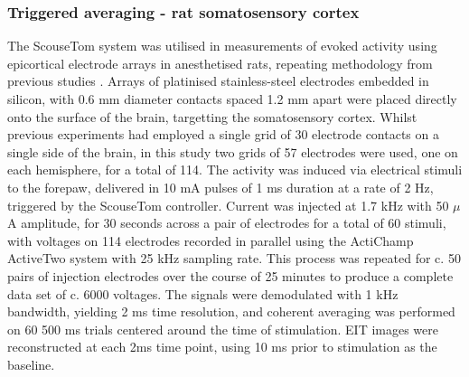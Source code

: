 \subsubsection{Triggered averaging - rat somatosensory cortex}
\label{MTrig}
The ScouseTom system was utilised in measurements of evoked activity using epicortical electrode arrays in anesthetised rats, repeating methodology from previous studies \cite{Aristovich_2016} \cite{Vongerichten_2016}. Arrays of platinised stainless-steel electrodes embedded in silicon, with 0.6 mm diameter contacts spaced 1.2 mm apart were placed directly onto the surface of the brain, targetting the somatosensory cortex. Whilst previous experiments had employed a single grid of 30 electrode contacts on a single side of the brain, in this study two grids of 57 electrodes were used, one on each hemisphere, for a total of 114. The activity was induced via electrical stimuli to the forepaw, delivered in 10 mA pulses of 1 ms duration at a rate of 2 Hz, triggered by the ScouseTom controller. Current was injected at 1.7 kHz with 50 $\mu$A amplitude, for 30 seconds across a pair of electrodes for a total of 60 stimuli, with voltages on 114 electrodes recorded in parallel using the ActiChamp ActiveTwo system with 25 kHz sampling rate. This process was repeated for c. 50 pairs of injection electrodes over the course of 25 minutes to produce a complete data set of c. 6000 voltages. The signals were demodulated with 1 kHz bandwidth, yielding 2 ms time resolution, and coherent averaging was performed on 60 500 ms trials centered around the time of stimulation. EIT images were reconstructed at each 2ms time point, using 10 ms prior to stimulation as the baseline. 
